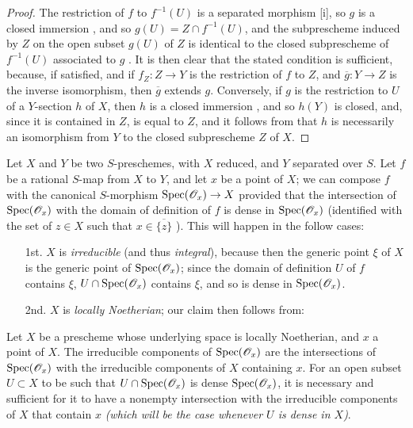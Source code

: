 \begin{proof}
The restriction of $f$ to $f^{-1}(U)$ is a separated morphism [i], so $g$ is a closed immersion , and so $g(U)=Z\cap f^{-1}(U)$, and the subprescheme induced by $Z$ on the open subset $g(U)$ of $Z$ is identical to the closed subprescheme of $f^{-1}(U)$ associated to $g$ .
It is then clear that the stated condition is sufficient, because, if satisfied, and if $f_Z:Z\to Y$ is the restriction of $f$ to $Z$, and $\overline{g}:Y\to Z$ is the inverse isomorphism, then $\overline{g}$ extends $g$.
Conversely, if $g$ is the restriction to $U$ of a $Y$-section $h$ of $X$, then $h$ is a closed immersion , and so $h(Y)$ is closed, and, since it is contained in $Z$, is equal to $Z$, and it follows from  that $h$ is necessarily an isomorphism from $Y$ to the closed subprescheme $Z$ of $X$.
\end{proof}

\begin{env}[7.2.8]
\label{I.7.2.8}
Let $X$ and $Y$ be two $S$-preschemes, with $X$ reduced, and $Y$ separated over $S$.
Let $f$ be a rational $S$-map from $X$ to $Y$, and let $x$ be a point of $X$; we can compose $f$ with the canonical $S$-morphism $\Spec(\sh{O}_x)\to X$  provided that the intersection of $\operatorname{Spec}(\mathscr{O}_x)$ with the domain of definition of $f$ is dense in $\operatorname{Spec}(\mathscr{O}_x)$ (identified with the set of $z\in X$ such that $x\in\overline{\{z\}}$ ).
This will happen in the follow cases:
\begin{enumerate}
  \item[1st.] $X$ is \emph{irreducible} (and thus \emph{integral}), because then the generic point $\xi$ of $X$ is the generic point of $\operatorname{Spec}(\mathscr{O}_x)$; since the domain of definition $U$ of $f$ contains $\xi$, $U\cap\operatorname{Spec}(\mathscr{O}_x)$ contains $\xi$, and so is dense in $\operatorname{Spec}(\mathscr{O}_x)$.
  \item[2nd.] $X$ is \emph{locally Noetherian}; our claim then follows from:
\end{enumerate}
\end{env}

\begin{lemma}[7.2.8.1]
\label{I.7.2.8.1}
Let $X$ be a prescheme whose underlying space is locally Noetherian, and $x$ a point of $X$.
The irreducible components of $\operatorname{Spec}(\mathscr{O}_x)$ are the intersections of $\operatorname{Spec}(\mathscr{O}_x)$ with the irreducible components of $X$ containing $x$.
For an open subset $U\subset X$ to be such that $U\cap\operatorname{Spec}(\mathscr{O}_x)$ is dense $\operatorname{Spec}(\mathscr{O}_x)$, it is necessary and sufficient for it to have a nonempty intersection with the irreducible components of $X$ that contain $x$ \emph{(which will be the case whenever $U$ is \emph{dense} in $X$)}.
\end{lemma}

